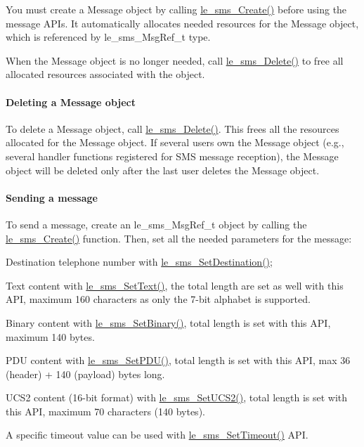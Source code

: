 You must create a Message object by calling {\ttfamily \hyperlink{le__sms__interface_8h_a668abcbcff2f1f3c5cdf799315a81058}{le\+\_\+sms\+\_\+\+Create()}} before using the message A\+P\+Is. It automatically allocates needed resources for the Message object, which is referenced by {\ttfamily le\+\_\+sms\+\_\+\+Msg\+Ref\+\_\+t} type.

When the Message object is no longer needed, call {\ttfamily \hyperlink{le__sms__interface_8h_aca1691010c88995cb47225f2889910fa}{le\+\_\+sms\+\_\+\+Delete()}} to free all allocated resources associated with the object.\hypertarget{c_sms_le_sms_ops_deleting_msg}{}\paragraph{Deleting a Message object}\label{c_sms_le_sms_ops_deleting_msg}
To delete a Message object, call \hyperlink{le__sms__interface_8h_aca1691010c88995cb47225f2889910fa}{le\+\_\+sms\+\_\+\+Delete()}. This frees all the resources allocated for the Message object. If several users own the Message object (e.\+g., several handler functions registered for S\+MS message reception), the Message object will be deleted only after the last user deletes the Message object.\hypertarget{c_sms_le_sms_ops_sending}{}\paragraph{Sending a message}\label{c_sms_le_sms_ops_sending}
To send a message, create an {\ttfamily le\+\_\+sms\+\_\+\+Msg\+Ref\+\_\+t} object by calling the {\ttfamily \hyperlink{le__sms__interface_8h_a668abcbcff2f1f3c5cdf799315a81058}{le\+\_\+sms\+\_\+\+Create()}} function. Then, set all the needed parameters for the message\+:
\begin{DoxyItemize}
\item Destination telephone number with \hyperlink{le__sms__interface_8h_a6fda3e193c9662c394412816ae508c23}{le\+\_\+sms\+\_\+\+Set\+Destination()};
\item Text content with \hyperlink{le__sms__interface_8h_aa5468a01069d8c8d03e5204453560d9a}{le\+\_\+sms\+\_\+\+Set\+Text()}, the total length are set as well with this A\+PI, maximum 160 characters as only the 7-\/bit alphabet is supported.
\item Binary content with \hyperlink{le__sms__interface_8h_ad135130755ab2979a265f65178a3ae0d}{le\+\_\+sms\+\_\+\+Set\+Binary()}, total length is set with this A\+PI, maximum 140 bytes.
\item P\+DU content with \hyperlink{le__sms__interface_8h_a0fc5c9da622cc48ef5f9d908dbcbbf92}{le\+\_\+sms\+\_\+\+Set\+P\+D\+U()}, total length is set with this A\+PI, max 36 (header) + 140 (payload) bytes long.
\item U\+C\+S2 content (16-\/bit format) with \hyperlink{le__sms__interface_8h_ac351541bd51f008551a55ea645e31599}{le\+\_\+sms\+\_\+\+Set\+U\+C\+S2()}, total length is set with this A\+PI, maximum 70 characters (140 bytes).
\item A specific timeout value can be used with \hyperlink{le__sms__interface_8h_a2b14febf0e2285b0b3c2dbcd1c2bb7b0}{le\+\_\+sms\+\_\+\+Set\+Timeout()} A\+PI.
\end{DoxyItemize}

